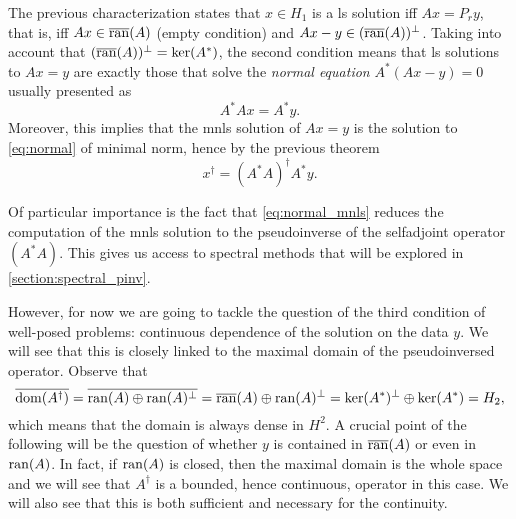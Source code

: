 \begin{lemma}
The previous characterization states that $x \in H_1$ is a 
ls solution iff $Ax = P_r y$, that is, iff
$Ax \in \overline{\operatorname{ran}}(A)$ (empty condition) and 
$Ax - y \in (\overline{\operatorname{ran}}(A))^\perp$.
Taking into account that 
$(\overline{\operatorname{ran}}(A))^\perp = \ker(A^*)$,
the second condition means that ls solutions to $Ax = y$ are 
exactly those that solve the \emph{normal equation}
$A^*(Ax - y) = 0$ usually presented as
\begin{equation}\label{eq:normal}
    A^* A x = A^* y.
\end{equation}
Moreover, this implies that the mnls solution of $Ax=y$ is 
the solution to \cref{eq:normal} of minimal norm, hence by  
the previous theorem
\begin{equation}\label{eq:normal_mnls}
    x^\dagger = (A^* A)^\dagger A^* y.
\end{equation}

Of particular importance is the fact that \cref{eq:normal_mnls}
reduces the computation of the mnls solution to the pseudoinverse
of the selfadjoint operator $(A^*A)$.
This gives us access to spectral methods that will be explored
in \cref{section:spectral_pinv}.

However, for now we are going to tackle the question of the 
third condition of well-posed problems: continuous dependence
of the solution on the data $y$.
We will see that this is closely linked to the maximal domain
of the pseudoinversed operator.
Observe that
\begin{equation*}
    \overline{\operatorname{dom}(A^\dagger)}
    = \overline{\operatorname{ran}(A) \oplus \operatorname{ran}(A)^\perp}
    = \overline{\operatorname{ran}}(A) \oplus \operatorname{ran}(A)^\perp
    = \ker(A^*)^\perp \oplus \ker(A^*)
    = H_2,
\end{equation*}
which means that the domain is always dense in $H^2$.
A crucial point of the following will be the question of 
whether $y$ is contained in $\overline{\operatorname{ran}}(A)$ or even
in $\operatorname{ran}(A)$.
In fact, if $\operatorname{ran}(A)$ is closed, then the maximal domain 
is the whole space and we will see that $A^\dagger$ is a 
bounded, hence continuous, operator in this case.
We will also see that this is both sufficient and necessary
for the continuity.


\end{lemma}
